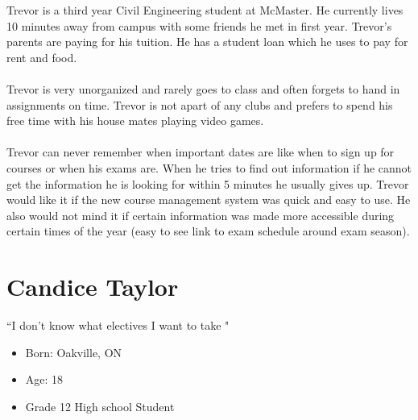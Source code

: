 \documentclass[12pt]{article}
\begin{document}
Trevor is a third year Civil Engineering student at McMaster. He currently lives 10 minutes away from campus with some friends he met in first year. Trevor's parents are paying for his tuition. He has a student loan which he uses to pay for rent and food.\\ \\
Trevor is very unorganized and rarely goes to class and often forgets to hand in assignments on time. Trevor is not apart of any clubs and prefers to spend his free time with his house mates playing video games.\\ \\
Trevor can never remember when important dates are like when to sign up for courses or when his exams are. When he tries to find out information if he cannot get the information he is looking for within 5 minutes he usually gives up. Trevor would like it if the new course management system was quick and easy to use. He also would not mind it if certain information was made more accessible during certain times of the year (easy to see link to exam schedule around exam season).


\newpage


\section{Candice Taylor}
\begin{minipage}{0.5\textwidth}
\begin{center}
``I don't know what electives I want to take "
\end{center}
\end{minipage} \hfill
\begin{minipage}{0.45\textwidth}
\begin{itemize}
\item Born: Oakville, ON
\item Age: 18
\item Grade 12 High school Student
\end{itemize}
\end{minipage}\\ \\ \\
\end{document}
